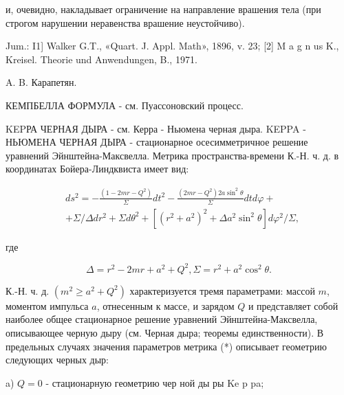 \documentclass[10pt]{article}
\begin{document}
и, очевидно, накладывает ограничение на направление врашения тела (при строгом нарушении неравенства врашение неустойчиво).



Jum.: I1] Walker G.T., «Quart. J. Appl. Math», 1896, v. 23; [2] M a g n us K., Kreisel. Theorie und Anwendungen, B., 1971.



A. B. Карапетян.



КЕМПБЕЛЛА ФОРМУЛА - см. Пуассоновский процесс.



KEPРА ЧЕРНАЯ ДЫРА - см. Керра - Ньюмена черная дыра. KEPPA - НЬЮМЕНА ЧЕРНАЯ ДЫРА - стационарное осесимметричное решение уравнений Эйнштейна-Максвелла. Метрика пространства-времени К.-Н. ч. д. в координатах Бойера-Линдквиста имеет вид:



\[

\begin{aligned}

& d s^{2}=-\frac{\left(1-2 m r-Q^{2}\right)}{\Sigma} d t^{2}-\frac{\left(2 m r-Q^{2}\right) 2 a \sin ^{2} \theta}{\Sigma} d t d \varphi+ \\

& +\Sigma / \Delta d r^{2}+\Sigma d \theta^{2}+\left[\left(r^{2}+a^{2}\right)^{2}+\Delta a^{2} \sin ^{2} \theta\right] d \varphi^{2} / \Sigma,

\end{aligned}

\]



где



\[

\Delta=r^{2}-2 m r+a^{2}+Q^{2}, \Sigma=r^{2}+a^{2} \cos ^{2} \theta .

\]



К.-Н. ч. д. $\left(m^{2} \geqslant a^{2}+Q^{2}\right)$ характеризуется тремя параметрами: массой $m$, моментом импульса $a$, отнесенным к массе, и зарядом $Q$ и представляет собой наиболее общее стационарное решение уравнений Эйнштейна-Максвелла, описывающее черную дыру (см. Черная дыра; теоремы единственности). В предельных случаях значения параметров метрика (*) описывает геометрию следующих черных дыр:



a) $Q=0$ - стационарную геометрию чер ной ды ры Ke p pa;
\end{document}
